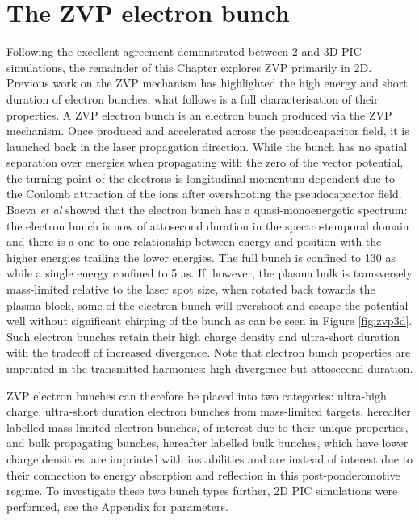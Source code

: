 \section{The ZVP electron bunch}\label{sec:zvp-bunches}
Following the excellent agreement demonstrated between 2 and 3D PIC simulations, the remainder of this Chapter explores ZVP primarily in 2D. Previous work on the ZVP mechanism has highlighted the high energy and short duration of electron bunches, what follows is a full characterisation of their properties. A ZVP electron bunch is an electron bunch produced via the ZVP mechanism. Once produced and accelerated across the pseudocapacitor field, it is launched back in the laser propagation direction. While the bunch has no spatial separation over energies when propagating with the zero of the vector potential, the turning point of the electrons is longitudinal momentum dependent due to the Coulomb attraction of the ions after overshooting the pseudocapacitor field. Baeva \textit{et al} showed that the electron bunch has a quasi-monoenergetic spectrum: the electron bunch is now of attosecond duration in the spectro-temporal domain and there is a one-to-one relationship between energy and position with the higher energies trailing the lower energies. The full bunch is confined to 130 as while a single energy confined to 5 as. If, however, the plasma bulk is transversely mass-limited relative to the laser spot size, when rotated back towards the plasma block, some of the electron bunch will overshoot and escape the potential well without significant chirping of the bunch as can be seen in Figure \ref{fig:zvp3d}. Such electron bunches retain their high charge density and ultra-short duration with the tradeoff of increased divergence. Note that electron bunch properties are imprinted in the transmitted harmonics: high divergence but attosecond duration.

ZVP electron bunches can therefore be placed into two categories: ultra-high charge, ultra-short duration electron bunches from mass-limited targets, hereafter labelled mass-limited electron bunches, of interest due to their unique properties, and bulk propagating bunches, hereafter labelled bulk bunches, which have lower charge densities, are imprinted with instabilities and are instead of interest due to their connection to energy absorption and reflection in this post-ponderomotive regime. To investigate these two bunch types further, 2D PIC simulations were performed, see the Appendix for parameters.


